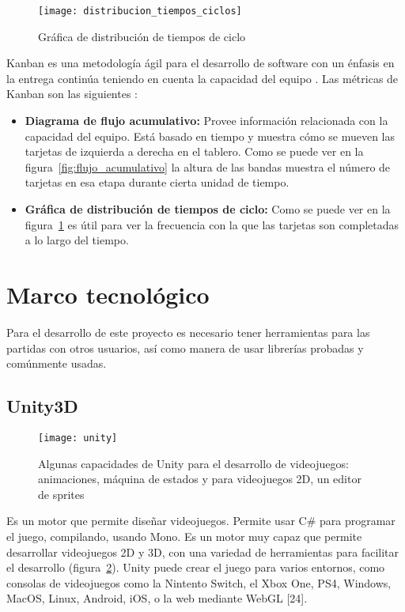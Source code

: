 \begin{figure}[h!]
    \centering
    \texttt{[image: distribucion\_tiempos\_ciclos]}
    \caption{Gráfica de distribución de tiempos de ciclo}
    \label{fig:distribucion_tiempos_ciclos}
\end{figure}

Kanban es una metodología ágil para el desarrollo de software con un énfasis 
en la entrega continúa teniendo en cuenta la capacidad del equipo \cite{romano-a}. 
Las métricas de Kanban son las siguientes \cite{najera2018a}:

\begin{itemize}
    \item \textbf{Diagrama de flujo acumulativo:} Provee información relacionada con la capacidad del equipo. Está basado en tiempo y muestra cómo se mueven las tarjetas de izquierda a derecha en el tablero. Como se puede ver en la figura~\ref{fig:flujo_acumulativo} la altura de las bandas muestra el número de tarjetas en esa etapa durante cierta unidad de tiempo.
    \item \textbf{Gráfica de distribución de tiempos de ciclo:} Como se puede ver en la figura~\ref{fig:distribucion_tiempos_ciclos} es útil para ver la frecuencia con la que las tarjetas son completadas a lo largo del tiempo.
\end{itemize}

\section{Marco tecnológico}
Para el desarrollo de este proyecto es necesario tener herramientas para las partidas con otros usuarios, así como manera de usar librerías probadas y comúnmente usadas.

\subsection{Unity3D}
\begin{figure}[h!]
    \centering
    \texttt{[image: unity]}
        \caption{Algunas capacidades de Unity para el desarrollo de videojuegos: animaciones, máquina de estados y para videojuegos 2D, un editor de sprites}
        \label{fig:unity_screenshot}
\end{figure}
Es un motor que permite diseñar videojuegos. Permite usar C\# para programar el juego, compilando, usando Mono\cite{unity2019}. Es un motor muy capaz que permite desarrollar videojuegos 2D y 3D, con una variedad de herramientas para facilitar el desarrollo (figura~\ref{fig:unity_screenshot}).
Unity puede crear el juego para varios entornos, como consolas de videojuegos como la Nintento Switch, el Xbox One, PS4, Windows, MacOS, Linux, Android, iOS, o la web mediante WebGL [24].

